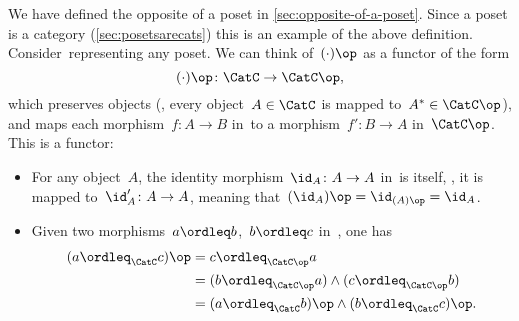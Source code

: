 \begin{example}
  We have defined the opposite of a poset in \cref{sec:opposite-of-a-poset}.
  Since a poset is a category (\cref{sec:posetsarecats})
  this is an example of the above definition. Consider~\CatC representing any poset. We can think of~$(\cdot)\op$ as a functor of the form
  \begin{equation}
  (\cdot)
    \op\colon \CatC \to \CatC\op,
  \end{equation}
  which preserves objects (\ie , every object~$A \in \CatC$ is mapped to~$A^*\in \CatC\op$), and maps each morphism~$f\colon A\to B$ in~\CatC to a morphism~$f'\colon B\to A$ in~$\CatC\op$. This is a functor:
  \begin{itemize}
    \item For any object~$A$, the identity morphism~$\id_A\colon A\to A$ in~\CatC is itself, \ie , it is mapped to~$\id_A'\colon A\to A$, meaning that~$(\id_A)\op=\id_{(A)\op}=\id_A$.
    \item Given two morphisms~$a\ordleq b$,~$b\ordleq c$ in~\CatC, one has
    \begin{equation}
      \begin{aligned}
      (a\ordleq_{\CatC} c)
        \op &=c\ordleq_{\CatC\op} a\\
        &=(b\ordleq_{\CatC\op} a)\wedge (c\ordleq_{\CatC\op}b)\\
        &=(a\ordleq_{\CatC} b)\op \wedge (b\ordleq_{\CatC} c)\op.
      \end{aligned}
    \end{equation}
  \end{itemize}
\end{example}








